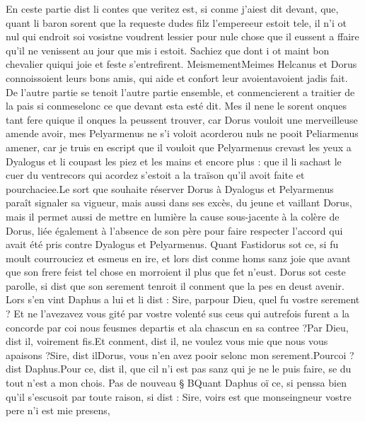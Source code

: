 \documentclass{article}
\begin{document}
\begin{pages}
            
\pstart En ceste partie dist li contes que 
   veritez est, si conme j’aiest dit devant, que, 
   quant li baron sorent que la requeste dudes 
   filz l’empereeur 
   estoit tele, 
   il n’i ot nul qui endroit soi vosistne voudrent lessier pour nule chose 
   que il eussent a ffaire qu’il ne venissent au jour que mis i estoit. 
   Sachiez que dont i ot maint bon chevalier quiqui joie et 
   feste s’entrefirent. MeismementMeimes Helcanus 
   et Dorus connoissoient leurs bons amis, qui aide et confort leur 
   avoientavoient jadis fait. 
               De l’autre partie se tenoit l’autre partie ensemble, et conmencierent a traitier de la pais 
   si conmeselonc ce que devant 
      esta esté dit. 
   Mes il nene le sorent onques tant fere 
   quique il onques la peussent trouver, car 
   Dorus vouloit une merveilleuse 
   amende avoir, 
   mes Pelyarmenus ne s’i voloit 
      acorderou nuls ne pooit Peliarmenus amener, 
   car je truis en escript que 
   il vouloit que Pelyarmenus 
               crevast les yeux a Dyalogus et li coupast les piez et les mains et encore plus : 
   que il li sachast le cuer du 
   ventrecors qui acordez s’estoit a la traïson qu’il avoit faite 
   et pourchaciee.Le sort que souhaite réserver Dorus à Dyalogus et Pelyarmenus paraît signaler sa vigueur, 
   mais aussi dans ses excès, du jeune et vaillant Dorus, mais il permet aussi de mettre en lumière la cause sous-jacente à la colère
   de Dorus, liée également à l'absence de son père pour faire respecter l'accord qui avait été pris contre Dyalogus et Pelyarmenus. \pend
\pstart Quant Fastidorus sot ce, 
   si fu moult courrouciez et esmeus en ire, et lors dist conme homs sanz joie que 
   avant que son frere feist tel chose 
      en morroient il plus que fet n’eust. 
   Dorus sot ceste parolle, si dist que son serement tenroit il 
      conment que la pes en deust avenir. 
   Lors s’en vint Daphus a lui et li dist :
   Sire, parpour Dieu, quel fu vostre serement ? 
      Et ne l’avezavez vous gité par vostre volenté sus ceus 
   qui autrefois furent a la concorde par coi nous feusmes departis et ala chascun en sa contree ?Par Dieu, dist il, voirement fis.Et conment, dist il, ne voulez vous mie que nous vous apaisons ?Sire, dist ilDorus, 
      vous n’en avez pooir selonc mon serement.Pourcoi ? dist Daphus.Pour ce, dist il, que cil n’i est pas sanz qui je ne le puis faire, se du tout n’est a mon chois. \pend
\pstart Pas de nouveau § BQuant Daphus oï ce, si penssa bien qu’il s’escusoit par toute raison,
   si dist :
   Sire, voirs est que monseingneur vostre pere n’i est mie presens, 

\end{pages}
\end{document}
